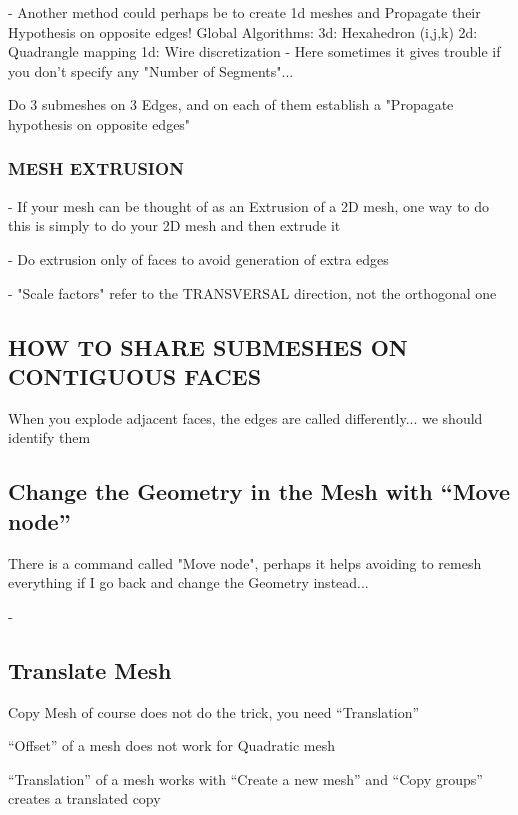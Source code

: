 \documentclass[10pt]{book}
\begin{document}
- Another method could perhaps be to create 1d meshes and Propagate their Hypothesis on opposite edges!
  Global Algorithms:
    3d: Hexahedron (i,j,k)
    2d: Quadrangle mapping
    1d: Wire discretization  - Here sometimes it gives trouble if you don't specify any "Number of Segments"...
    
    Do 3 submeshes on 3 Edges, and on each of them establish a "Propagate hypothesis on opposite edges"
    

    
\subsubsection{MESH EXTRUSION}


- If your mesh can be thought of as an Extrusion of a 2D mesh, one way to do this 
  is simply to do your 2D mesh and then extrude it
  
- Do extrusion only of faces to avoid generation of extra edges    

- "Scale factors" refer to the TRANSVERSAL direction, not the orthogonal one



\subsection{HOW TO SHARE SUBMESHES ON CONTIGUOUS FACES}


When you explode adjacent faces, the edges are called differently... we should identify them


 \subsection{Change the Geometry in the Mesh with ``Move node''}


 There is a command called "Move node", perhaps it helps avoiding to remesh everything if I go back and change the Geometry instead...

 - 
 

\subsection{Translate Mesh}

 
 Copy Mesh of course does not do the trick, you need ``Translation''
 
 ``Offset'' of a mesh does not work for Quadratic mesh
 
 ``Translation'' of a mesh works with ``Create a new mesh'' and ``Copy groups'' creates a translated copy
\end{document}
